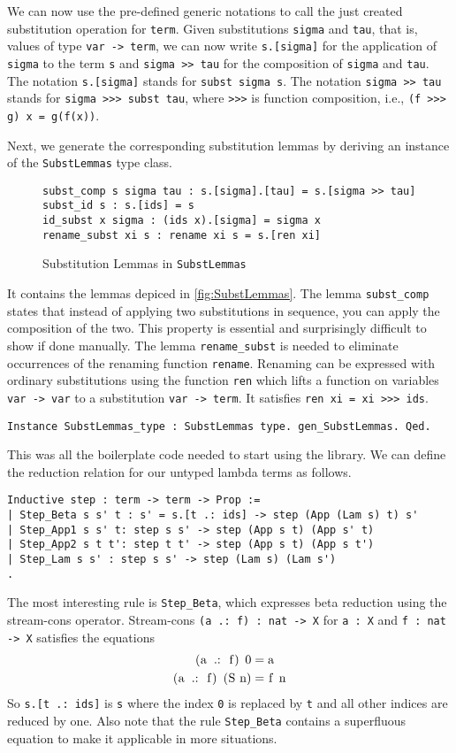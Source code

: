\documentclass{scrartcl}
\newcommand{\lst}{\lstinline}
\begin{document}
We can now use the pre-defined generic notations to call the just created substitution operation for \lst$term$. Given substitutions \lst$sigma$ and \lst$tau$, that is, values of type \lst$var -> term$, we can now write \lst$s.[sigma]$ for the application of \lst$sigma$ to  the term \lst$s$ and \lst$sigma >> tau$ for the composition of \lst$sigma$ and \lst$tau$. 
The notation \lst$s.[sigma]$ stands for \lst$subst sigma s$. 
The notation \lst$sigma >> tau$ stands for \lst$sigma >>> subst tau$, where \lst$>>>$ is function composition, i.e., \lst$(f >>> g) x = g(f(x))$.

Next, we generate the corresponding substitution lemmas by deriving an instance of the \lst$SubstLemmas$ type class.
\begin{figure}
\begin{lstlisting}
subst_comp s sigma tau : s.[sigma].[tau] = s.[sigma >> tau]
subst_id s : s.[ids] = s
id_subst x sigma : (ids x).[sigma] = sigma x
rename_subst xi s : rename xi s = s.[ren xi]
\end{lstlisting}
  \caption{Substitution Lemmas in \lst$SubstLemmas$}
  \label{fig:SubstLemmas}
\end{figure}
It contains the lemmas depiced in \autoref{fig:SubstLemmas}.
The lemma \lst$subst_comp$ states that instead of applying two substitutions in sequence, you can apply the composition of the two. This property is essential and surprisingly difficult to show if done manually. 
The lemma \lst$rename_subst$ is needed to eliminate occurrences of the renaming function \lst$rename$. Renaming can be expressed with ordinary substitutions using the function \lst$ren$ which lifts a function on variables \lst$var -> var$ to a substitution \lst$var -> term$. It satisfies \lst$ren xi = xi >>> ids$.
\begin{lstlisting}
Instance SubstLemmas_type : SubstLemmas type. gen_SubstLemmas. Qed.
\end{lstlisting}


This was all the boilerplate code needed to start using the library.
We can define the reduction relation for our untyped lambda terms as follows.
\begin{lstlisting}
Inductive step : term -> term -> Prop :=
| Step_Beta s s' t : s' = s.[t .: ids] -> step (App (Lam s) t) s'
| Step_App1 s s' t: step s s' -> step (App s t) (App s' t)
| Step_App2 s t t': step t t' -> step (App s t) (App s t')
| Step_Lam s s' : step s s' -> step (Lam s) (Lam s')
.
\end{lstlisting}
The most interesting rule is \lst$Step_Beta$, which expresses beta reduction using the stream-cons operator. Stream-cons \lst$(a .: f) : nat -> X$ for \lst$a : X$ and \lst$f : nat -> X$ satisfies the equations
\begin{align*}
  \text{\lst$(a .: f) 0$} &= \text{\lst$a$} \\
  \text{\lst$(a .: f) (S n)$} &= \text{\lst$f n$}
\end{align*}
So \lst$s.[t .: ids]$ is \lst$s$ where the index \lst$0$ is replaced by \lst$t$ and all other indices are reduced by one.
Also note that the rule \lst$Step_Beta$ contains a superfluous equation to make it applicable in more situations.
\end{document}
